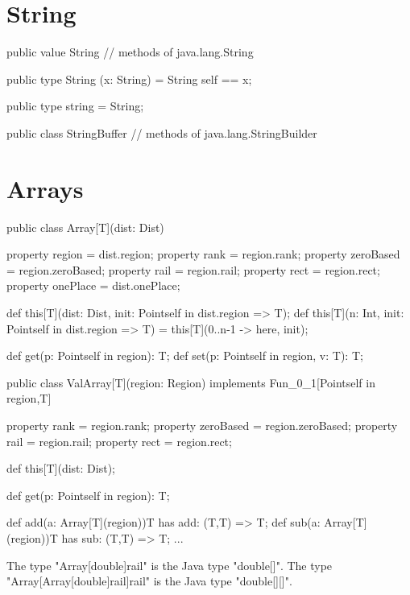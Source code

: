 \section{String}

\begin{xten}
public value String  {
    // methods of java.lang.String
}

public type String (x: String) = String {self == x};

public type string = String;

public class StringBuffer {
    // methods of java.lang.StringBuilder
}
\end{xten}

\section{Arrays}

\begin{xten}
public class Array[T](dist: Dist) {
    property region = dist.region;
    property rank = region.rank;
    property zeroBased = region.zeroBased;
    property rail = region.rail;
    property rect = region.rect;
    property onePlace = dist.onePlace;

    def this[T](dist: Dist, init: Point{self in dist.region} => T);
    def this[T](n: Int, init: Point{self in dist.region} => T) = {
        this[T](0..n-1 -> here, init);
    }

    def get(p: Point{self in region}): T;
    def set(p: Point{self in region}, v: T): T;
}
\end{xten}

\begin{xten}
public class ValArray[T](region: Region)
    implements Fun_0_1[Point{self in region},T] {

    property rank = region.rank;
    property zeroBased = region.zeroBased;
    property rail = region.rail;
    property rect = region.rect;

    def this[T](dist: Dist);

    def get(p: Point{self in region}): T;

    def add(a: Array[T](region)){T has add: (T,T) => T};
    def sub(a: Array[T](region)){T has sub: (T,T) => T};
    ...
}
\end{xten}

  The type \xcd"Array[double]{rail}" is the Java type \xcd"double[]".
  The type \xcd"Array[Array[double]{rail}]{rail}" is the Java type \xcd"double[][]".

